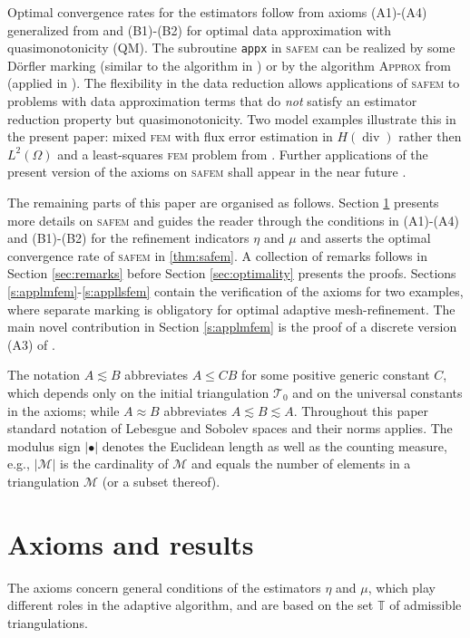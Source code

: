 \documentclass{siamltex1213}
\begin{document}
Optimal convergence rates for the estimators follow from  axioms (A1)-(A4) 
generalized from \cite{CFP14} and (B1)-(B2) for optimal  data approximation with quasimonotonicity (QM). 
The subroutine  \texttt{appx}  in {\textsc{safem}\xspace} can be realized by some D\"orfler marking (similar to the algorithm in \cite{mfemBeckerMao08}) or by the algorithm {{\scshape Approx}\xspace}  from \cite{BDD04,BD04}  (applied in \cite{CR09,safem2015}). The flexibility in the data reduction allows
applications of {\textsc{safem}\xspace} to  problems with data approximation terms that do \textit{not} satisfy an
estimator reduction property but quasimonotonicity.  Two model examples illustrate this in the present paper: mixed {\textsc{fem}\xspace} with flux error estimation in $H(\operatorname{div})$ rather then $L^2(\Omega)$ \cite{CR09} and a least-squares {\textsc{fem}\xspace} problem from \cite{CCP-lsfem}. Further applications of the present version of the axioms on {\textsc{safem}\xspace} shall
appear in the near future \cite{lsfemBC,BCStarke}.

The remaining parts of this paper are organised as follows. Section \ref{sec:axioms} presents more details on {\textsc{safem}\xspace} and guides the reader through the conditions in (A1)-(A4) and (B1)-(B2) for the refinement indicators $\eta$ and $\mu$ and asserts the optimal convergence rate of {\textsc{safem}\xspace} in \cref{thm:safem}. 
A collection of remarks follows in Section \ref{sec:remarks} before Section \ref{sec:optimality} presents the proofs. Sections \ref{s:applmfem}-\ref{s:appllsfem} contain the verification of the axioms for two examples, where separate marking is obligatory for optimal adaptive mesh-refinement.
The main novel contribution in Section \ref{s:applmfem} is the proof of a discrete version  (A3) of \cite{ccdpas2015}.

The notation $A \lesssim B$ abbreviates $A \leq CB$ for some positive generic constant $C$, which depends only on the initial triangulation ${\mathcal T_{0}}$ and on the universal constants in the axioms; while $A\approx B$ abbreviates $A\lesssim B \lesssim A$.
Throughout this paper standard notation of Lebesgue and Sobolev spaces and their norms applies. The modulus sign 
$|\bullet|$ denotes the Euclidean length as well as the counting measure, e.g., $|\mathcal{M}|$ is the cardinality of 
$\mathcal{M}$ and equals the number of elements
in a triangulation $\mathcal{M}$ (or a subset thereof). 

\section{Axioms and results}\label{sec:axioms}
The axioms concern general conditions of the estimators $\eta$ and $\mu$,
which play different roles in the adaptive algorithm,  and are based on the set ${\mathbb T}$ 
of admissible triangulations. 
\end{document}
